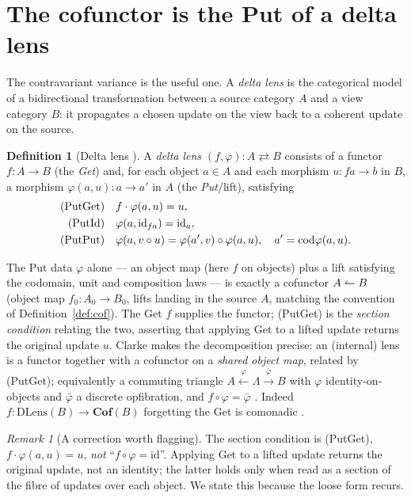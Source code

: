 \documentclass[11pt,a4paper]{amsart}
\newcommand{\Cof}{\mathbf{Cof}}
\newcommand{\id}{\mathrm{id}}
\newcommand{\cod}{\mathrm{cod}}
\newcommand{\co}{\mathrel{\text{\reflectbox{$\rightharpoonup$}}}}
\theoremstyle{plain}
\theoremstyle{definition}
\newtheorem{definition}[theorem]{Definition}
\theoremstyle{remark}
\newtheorem{remark}[theorem]{Remark}
\begin{document}
\section{The cofunctor is the Put of a delta lens}\label{sec:lens}

The contravariant variance is the useful one. A \emph{delta lens} \cite{JR13,Clarke20}
is the categorical model of a bidirectional transformation between a source category $A$
and a view category $B$: it propagates a chosen update on the view back to a coherent
update on the source.

\begin{definition}[Delta lens \cite{Clarke22}]\label{def:lens}
A \emph{delta lens} $(f,\varphi)\colon A\rightleftarrows B$ consists of a functor
$f\colon A\to B$ (the \emph{Get}) and, for each object $a\in A$ and each morphism
$u\colon fa\to b$ in $B$, a morphism $\varphi(a,u)\colon a\to a'$ in $A$ (the
\emph{Put}/lift), satisfying
\begin{align}
  \text{(PutGet)}\quad & f\cdot\varphi(a,u)=u, \notag\\
  \text{(PutId)}\quad  & \varphi(a,\id_{fa})=\id_a, \notag\\
  \text{(PutPut)}\quad & \varphi(a,v\circ u)=\varphi(a',v)\circ\varphi(a,u),
        \quad a'=\cod\varphi(a,u). \notag
\end{align}
\end{definition}

The Put data $\varphi$ alone --- an object map (here $f$ on objects) plus a lift
satisfying the codomain, unit and composition laws --- is exactly a cofunctor
$A\co B$ \cite[Def.\,3]{Clarke22} (object map $f_0\colon A_0\to B_0$, lifts landing in
the source $A$, matching the convention of Definition~\ref{def:cof}). The Get $f$ supplies the functor; (PutGet) is the
\emph{section condition} relating the two, asserting that applying Get to a lifted
update returns the original update $u$. Clarke makes the decomposition precise: an
(internal) lens is a functor together with a cofunctor on a \emph{shared object map},
related by (PutGet); equivalently a commuting triangle
$A\xleftarrow{\varphi}\Lambda\xrightarrow{\bar\varphi}B$ with $\varphi$
identity-on-objects and $\bar\varphi$ a discrete opfibration, and $f\circ\varphi=\bar\varphi$
\cite[Cor.\,20]{Clarke20}. Indeed $f\colon\mathrm{DLens}(B)\to\Cof(B)$ forgetting the Get
is comonadic \cite[Thm.\,9]{Clarke22}.

\begin{remark}[A correction worth flagging]
The section condition is (PutGet), $f\cdot\varphi(a,u)=u$, \emph{not} ``$f\circ\varphi=\id$''.
Applying Get to a lifted update returns the original update, not an identity; the latter
holds only when read as a section of the fibre of updates over each object. We state this
because the loose form recurs.
\end{remark}
\end{document}
